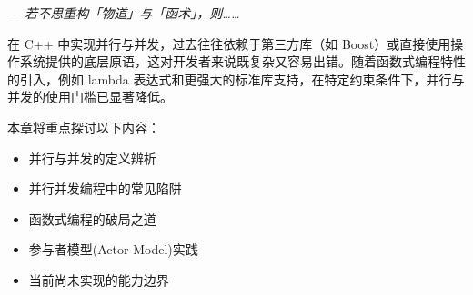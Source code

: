 \begin{flushright}
\textit{--- 若不思重构「物道」与「函术」，则……}
\end{flushright}

在 C++ 中实现并行与并发，过去往往依赖于第三方库（如 Boost）或直接使用操作系统提供的底层原语，这对开发者来说既复杂又容易出错。随着函数式编程特性的引入，例如 lambda 表达式和更强大的标准库支持，在特定约束条件下，并行与并发的使用门槛已显著降低。

本章将重点探讨以下内容：

\begin{itemize}
\item 
并行与并发的定义辨析

\item 
并行并发编程中的常见陷阱

\item 
函数式编程的破局之道

\item 
参与者模型(Actor Model)实践

\item 
当前尚未实现的能力边界
\end{itemize}













